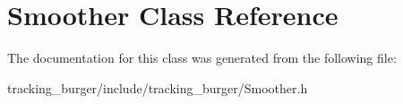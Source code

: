 \hypertarget{class_smoother}{}\section{Smoother Class Reference}
\label{class_smoother}


The documentation for this class was generated from the following file\+:\begin{DoxyCompactItemize}
\item 
tracking\+\_\+burger/include/tracking\+\_\+burger/Smoother.\+h\end{DoxyCompactItemize}
